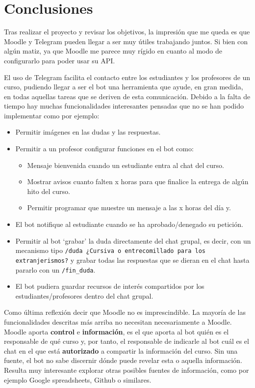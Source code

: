 \section{Conclusiones}

Tras realizar el proyecto y revisar los objetivos, la impresión que me queda es que Moodle y Telegram pueden llegar a ser muy útiles trabajando juntos. Si bien con algún matiz, ya que Moodle me parece muy rígido en cuanto al modo de configurarlo para poder usar su API.
\par
El uso de Telegram facilita el contacto entre los estudiantes y los profesores de un curso, pudiendo llegar a ser el bot una herramienta que ayude, en gran medida, en todas aquellas tareas que se deriven de esta comunicación. Debido a la falta de tiempo hay muchas funcionalidades interesantes pensadas que no se han podido implementar como por ejemplo:
\begin{itemize}
\item Permitir imágenes en las dudas y las respuestas. 
\item Permitir a un profesor configurar funciones en el bot como:
\begin{itemize}
\item Mensaje bienvenida cuando un estudiante entra al chat del curso. 
\item Mostrar avisos cuanto falten x horas para que finalice la entrega de algún hito del curso.
\item Permitir programar que muestre un mensaje a las x horas del día y.
\end{itemize}
\item El bot notifique al estudiante cuando se ha aprobado/denegado su petición.
\item Permitir al bot \enquote*{grabar} la duda directamente del chat grupal, es decir, con un mecanismo tipo  \texttt{/duda ¿Cursiva o entrecomillado para los extranjerismos?} y grabar todas las respuestas que se dieran en el chat hasta pararlo con un  \texttt{/fin\_duda}.
\item El bot pudiera guardar recursos de interés compartidos por los estudiantes/profesores dentro del chat grupal.
\end{itemize}


Como última reflexión decir que Moodle no es imprescindible. La mayoría de las funcionalidades descritas más arriba no necesitan necesariamente a Moodle. 
Moodle aporta \textbf{control} e \textbf{información}, es el que aporta al bot quién es el responsable de qué curso y, por tanto, el responsable de indicarle al bot cuál es el chat en el que está \textbf{autorizado} a compartir la información del curso. Sin una fuente, el bot no sabe discernir dónde puede revelar esta o aquella información. Resulta muy interesante explorar otras posibles fuentes de información, como por ejemplo Google spreadsheets, Github o similares. 